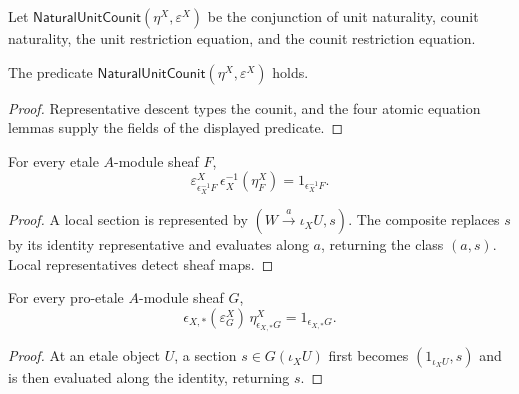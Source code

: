 \begin{definition}
\label{def:weil-efi-site-unit-counit-certificate}
Let $\mathsf{NaturalUnitCounit}(\eta^X,\varepsilon^X)$ be the conjunction of
unit naturality, counit naturality, the unit restriction equation, and the
counit restriction equation.
\end{definition}

\begin{proposition}
\label{prop:weil-efi-site-unit-counit-package}
The predicate $\mathsf{NaturalUnitCounit}(\eta^X,\varepsilon^X)$ holds.
\end{proposition}
\begin{proof}
Representative descent types the counit, and the four atomic equation lemmas
supply the fields of the displayed predicate.
\end{proof}

\begin{lemma}
\label{lemma:weil-efi-site-left-triangle}
For every etale $A$-module sheaf $F$,
\[
 \varepsilon^X_{\epsilon_X^{-1}F}\,
 \epsilon_X^{-1}(\eta^X_F)=1_{\epsilon_X^{-1}F}.
\]
\end{lemma}
\begin{proof}
A local section is represented by $(W\xrightarrow a\iota_XU,s)$.  The
composite replaces $s$ by its identity representative and evaluates along
$a$, returning the class $(a,s)$.  Local representatives detect sheaf maps.
\end{proof}

\begin{lemma}
\label{lemma:weil-efi-site-right-triangle}
For every pro-etale $A$-module sheaf $G$,
\[
 \epsilon_{X,*}(\varepsilon^X_G)\,
 \eta^X_{\epsilon_{X,*}G}=1_{\epsilon_{X,*}G}.
\]
\end{lemma}
\begin{proof}
At an etale object $U$, a section $s\in G(\iota_XU)$ first becomes
$(1_{\iota_XU},s)$ and is then evaluated along the identity, returning $s$.
\end{proof}

